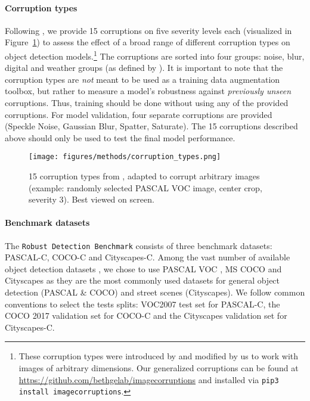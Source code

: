 \documentclass{article}
\begin{document}
\paragraph{Corruption types} Following \cite{hendrycks2018benchmarking}, we provide 15 corruptions on five severity levels each (visualized in Figure~\ref{fig: pascal_corrupted}) to assess the effect of a broad range of different corruption types on object detection models.\footnote{These corruption types were introduced by \cite{hendrycks2018benchmarking} and modified by us to work with images of arbitrary dimensions. Our generalized corruptions can be found at \url{https://github.com/bethgelab/imagecorruptions}
and installed via \texttt{pip3 install imagecorruptions}.} The corruptions are sorted into four groups: noise, blur, digital and weather groups (as defined by \cite{hendrycks2018benchmarking}).
It is important to note that the corruption types are \textit{not} meant to be used as a training data augmentation toolbox, but rather to measure a model's robustness against \textit{previously unseen} corruptions. Thus, training should be done without using any of the provided corruptions. For model validation, four separate corruptions are provided (Speckle Noise, Gaussian Blur, Spatter, Saturate). The 15 corruptions described above should only be used to test the final model performance.


\begin{figure}[t]
    \centering
    \texttt{[image: figures/methods/corruption\_types.png]}
    \caption{15 corruption types from \cite{hendrycks2018benchmarking}, adapted to corrupt arbitrary images (example: randomly selected PASCAL VOC image, center crop, severity 3). Best viewed on screen.}
    \label{fig: pascal_corrupted}
    \vspace{-0.2cm}
\end{figure}

\paragraph{Benchmark datasets} The \texttt{Robust Detection Benchmark} consists of three benchmark datasets: PASCAL-C, COCO-C and Cityscapes-C. Among the vast number of available object detection datasets \citep{Everingham2010, Geiger2012, Lin2014, Cordts2016, Zhou2017, Neuhold2017, Krasin2017}, we chose to use PASCAL VOC \citep{Everingham2010}, MS COCO \citep{Lin2014} and Cityscapes \citep{Cordts2016} as they are the most commonly used datasets for general object detection (PASCAL \& COCO) and street scenes (Cityscapes).
We follow common conventions to select the tests splits: VOC2007 test set for PASCAL-C, the COCO 2017 validation set for COCO-C and the Cityscapes validation set for Cityscapes-C.
\end{document}
